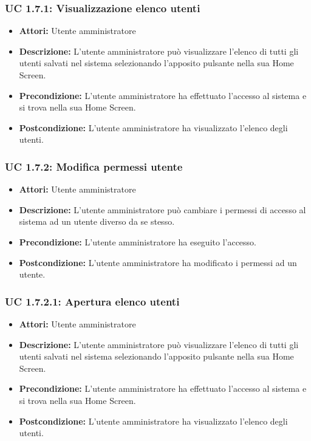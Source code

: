 \subsubsection{UC 1.7.1: Visualizzazione elenco utenti}

\begin{itemize}
\item \textbf{Attori:} Utente amministratore
\item \textbf{Descrizione:} L'utente amministratore può visualizzare l'elenco di tutti gli utenti salvati nel sistema selezionando l'apposito pulsante nella sua Home Screen.
\item \textbf{Precondizione:} L'utente amministratore ha effettuato l'accesso al sistema e si trova nella sua Home Screen.
\item \textbf{Postcondizione:} L'utente amministratore ha visualizzato l'elenco degli utenti.
\end{itemize}

\subsubsection{UC 1.7.2: Modifica permessi utente}

\begin{itemize}
\item \textbf{Attori:} Utente amministratore
\item \textbf{Descrizione:} L'utente amministratore può cambiare i permessi di accesso al sistema ad un utente diverso da se stesso.
\item \textbf{Precondizione:} L'utente amministratore ha eseguito l'accesso.
\item \textbf{Postcondizione:} L'utente amministratore ha modificato i permessi ad un utente.
\end{itemize}

\subsubsection{UC 1.7.2.1: Apertura elenco utenti}

\begin{itemize}
\item \textbf{Attori:} Utente amministratore
\item \textbf{Descrizione:} L'utente amministratore può visualizzare l'elenco di tutti gli utenti salvati nel sistema selezionando l'apposito pulsante nella sua Home Screen.
\item \textbf{Precondizione:} L'utente amministratore ha effettuato l'accesso al sistema e si trova nella sua Home Screen.
\item \textbf{Postcondizione:} L'utente amministratore ha visualizzato l'elenco degli utenti.
\end{itemize}

